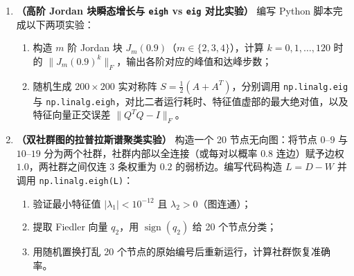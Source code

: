 \begin{enumerate}[label=\textbf{3.\arabic*}, leftmargin=2.4em, resume]
  \item \textbf{（高阶 Jordan 块瞬态增长与 \texttt{eigh} vs \texttt{eig} 对比实验）} 编写 Python 脚本完成以下两项实验：
  \begin{enumerate}[label=(\arabic*), leftmargin=1.8em]
    \item 构造 $m$ 阶 Jordan 块 $J_m(0.9)$（$m \in \{2, 3, 4\}$），计算 $k = 0, 1, \dots, 120$ 时的 $\|J_m(0.9)^k\|_F$，输出各阶对应的峰值和达峰步数；
    \item 随机生成 $200\times 200$ 实对称阵 $S = \frac{1}{2}(A + A^T)$，分别调用 \texttt{np.linalg.eig} 与 \texttt{np.linalg.eigh}，对比二者运行耗时、特征值虚部的最大绝对值，以及特征向量正交误差 $\|Q^T Q - I\|_F$。
  \end{enumerate}
  \par\smallskip{}

  \item \textbf{（双社群图的拉普拉斯谱聚类实验）} 构造一个 20 节点无向图：将节点 $0\text{--}9$ 与 $10\text{--}19$ 分为两个社群，社群内部以全连接（或每对以概率 $0.8$ 连边）赋予边权 $1.0$，两社群之间仅连 3 条权重为 $0.2$ 的弱桥边。编写代码构造 $L = D - W$ 并调用 \texttt{np.linalg.eigh(L)}：
  \begin{enumerate}[label=(\arabic*), leftmargin=1.8em]
    \item 验证最小特征值 $|\lambda_1| < 10^{-12}$ 且 $\lambda_2 > 0$（图连通）；
    \item 提取 Fiedler 向量 $q_2$，用 $\operatorname{sign}(q_2)$ 给 20 个节点分类；
    \item 用随机置换打乱 20 个节点的原始编号后重新运行，计算社群恢复准确率。
  \end{enumerate}
  \par\smallskip{}
\end{enumerate}
